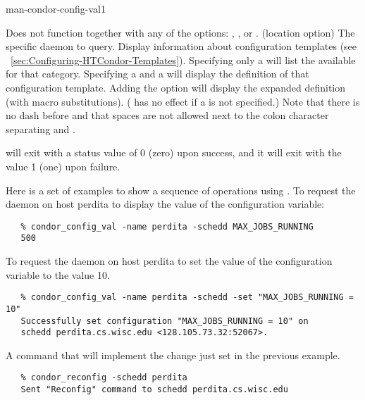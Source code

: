 \begin{ManPage}{}{man-condor-config-val}{1}
\begin{Options}
{    Does not function together with any of the options:
    , , or . }
    {(location option) The specific daemon to query. }
    {Display information about configuration templates (see
    ~\ref{sec:Configuring-HTCondor-Templates}).
    Specifying only a  will list the 
    available for that category.
    Specifying a  and a  will display
    the definition of that configuration template.
    Adding the  option will display the expanded
    definition (with macro substitutions).  ( has no
    effect if a  is not specified.)
    Note that there is no dash before  and that spaces are not
    allowed next to the colon character separating 
    and .
    }
    
\end{Options}

\ExitStatus

 will exit with a status value of 0 (zero) upon success,
and it will exit with the value 1 (one) upon failure.

\Examples

Here is a set of examples to show a sequence of operations using 
.
To request the  daemon on host perdita
to display the value of the  configuration variable:
\footnotesize
\begin{verbatim}
   % condor_config_val -name perdita -schedd MAX_JOBS_RUNNING
   500
\end{verbatim}
\normalsize

To request the  daemon on host perdita
to set the value of the  configuration variable
to the value 10.
\footnotesize
\begin{verbatim}
   % condor_config_val -name perdita -schedd -set "MAX_JOBS_RUNNING = 10"
   Successfully set configuration "MAX_JOBS_RUNNING = 10" on 
   schedd perdita.cs.wisc.edu <128.105.73.32:52067>.
\end{verbatim}
\normalsize

A command that will implement the change just set in the previous
example.
\footnotesize
\begin{verbatim}
   % condor_reconfig -schedd perdita
   Sent "Reconfig" command to schedd perdita.cs.wisc.edu
\end{verbatim}
\normalsize


\end{ManPage}
